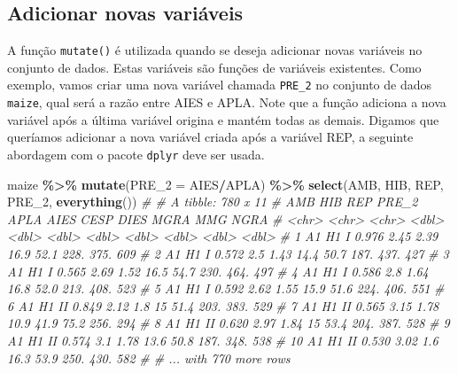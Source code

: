 \documentclass[
]{book}
\makeatletter
\newenvironment{Shaded}{\begin{snugshade}}{\end{snugshade}}
\newcommand{\CommentTok}[1]{\textcolor[rgb]{0.56,0.35,0.01}{\textit{#1}}}
\newcommand{\DataTypeTok}[1]{\textcolor[rgb]{0.13,0.29,0.53}{#1}}
\newcommand{\DecValTok}[1]{\textcolor[rgb]{0.00,0.00,0.81}{#1}}
\newcommand{\KeywordTok}[1]{\textcolor[rgb]{0.13,0.29,0.53}{\textbf{#1}}}
\newcommand{\NormalTok}[1]{#1}
\newcommand{\OperatorTok}[1]{\textcolor[rgb]{0.81,0.36,0.00}{\textbf{#1}}}
\newcommand{\StringTok}[1]{\textcolor[rgb]{0.31,0.60,0.02}{#1}}
\numberwithin{equation}{section}
\newcommand{\indf}[1]{\index[function]{#1@\texttt{#1()}|ST}}
\makeatother
\begin{document}
\hypertarget{adicionar-novas-variuxe1veis}{%
\subsection{Adicionar novas variáveis}\label{adicionar-novas-variuxe1veis}}

A função \texttt{mutate()} \indf{mutate} é utilizada quando se deseja adicionar novas variáveis no conjunto de dados. Estas variáveis são funções de variáveis existentes. Como exemplo, vamos criar uma nova variável chamada \texttt{PRE\_2} no conjunto de dados \texttt{maize}, qual será a razão entre AIES e APLA. Note que a função adiciona a nova variável após a última variável origina e mantém todas as demais. Digamos que queríamos adicionar a nova variável criada após a variável REP, a seguinte abordagem com o pacote \texttt{dplyr} deve ser usada.

\begin{Shaded}
\begin{Highlighting}[]

\NormalTok{maize }\OperatorTok{\%\textgreater{}\%}\StringTok{ }
\StringTok{  }\KeywordTok{mutate}\NormalTok{(}\DataTypeTok{PRE\_2 =}\NormalTok{ AIES}\OperatorTok{/}\NormalTok{APLA) }\OperatorTok{\%\textgreater{}\%}
\StringTok{  }\KeywordTok{select}\NormalTok{(AMB, HIB, REP, PRE\_}\DecValTok{2}\NormalTok{, }\KeywordTok{everything}\NormalTok{())}
\CommentTok{\# \# A tibble: 780 x 11}
\CommentTok{\#    AMB   HIB   REP   PRE\_2  APLA  AIES  CESP  DIES  MGRA   MMG  NGRA}
\CommentTok{\#    \textless{}chr\textgreater{} \textless{}chr\textgreater{} \textless{}chr\textgreater{} \textless{}dbl\textgreater{} \textless{}dbl\textgreater{} \textless{}dbl\textgreater{} \textless{}dbl\textgreater{} \textless{}dbl\textgreater{} \textless{}dbl\textgreater{} \textless{}dbl\textgreater{} \textless{}dbl\textgreater{}}
\CommentTok{\#  1 A1    H1    I     0.976  2.45  2.39  16.9  52.1 228.   375.   609}
\CommentTok{\#  2 A1    H1    I     0.572  2.5   1.43  14.4  50.7 187.   437.   427}
\CommentTok{\#  3 A1    H1    I     0.565  2.69  1.52  16.5  54.7 230.   464.   497}
\CommentTok{\#  4 A1    H1    I     0.586  2.8   1.64  16.8  52.0 213.   408.   523}
\CommentTok{\#  5 A1    H1    I     0.592  2.62  1.55  15.9  51.6 224.   406.   551}
\CommentTok{\#  6 A1    H1    II    0.849  2.12  1.8   15    51.4 203.   383.   529}
\CommentTok{\#  7 A1    H1    II    0.565  3.15  1.78  10.9  41.9  75.2  256.   294}
\CommentTok{\#  8 A1    H1    II    0.620  2.97  1.84  15    53.4 204.   387.   528}
\CommentTok{\#  9 A1    H1    II    0.574  3.1   1.78  13.6  50.8 187.   348.   538}
\CommentTok{\# 10 A1    H1    II    0.530  3.02  1.6   16.3  53.9 250.   430.   582}
\CommentTok{\# \# ... with 770 more rows}
\end{Highlighting}
\end{Shaded}
\end{document}
